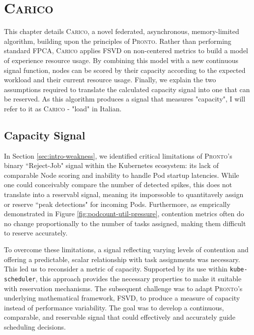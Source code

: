 \chapter{\protect\textsc{Carico}}
This chapter details \textsc{Carico}, a novel federated, asynchronous,
memory-limited algorithm, building upon the principles of \textsc{Pronto}.
Rather than performing standard FPCA, \textsc{Carico} applies FSVD on
non-centered metrics to build a model of experience resource usage. By combining
this model with a new continuous signal function, nodes can be scored by their
capacity according to the expected workload and their current resource usage.
Finally, we explain the two assumptions required to translate the calculated
capacity signal into one that can be reserved. As this algorithm produces a
signal that measures "capacity", I will refer to it as \textsc{Carico} - "load"
in Italian.

\section{Capacity Signal}
In Section \ref{sec:intro-weakness}, we identified critical limitations of
\textsc{Pronto}'s binary ``Reject-Job" signal within the Kubernetes ecosystem:
its lack of comparable Node scoring and inability to handle Pod startup
latencies. While one could conceivably compare the number of detected spikes,
this does not translate into a reservabl signal, meaning its imporssoble to
quantitavely assign or reserve ``peak detections" for incoming Pods.
Furthermore, as emprically demonstrated in Figure
\ref{fig:podcount-util-pressure}, contention metrics often do no change
proportionally to the number of tasks assigned, making them difficult to reserve
accurately.

To overcome these limitations, a signal reflecting varying levels of contention
and offering a predictable, scalar relationship with task assignments was
necessary. This led us to reconsider a metric of capacity. Supported by its use
within \texttt{kube-scheduler}, this approach provides the necessary properties
to make it suitable with reservation mechanisms. The subsequent challenge was to
adapt \textsc{Pronto}'s underlying mathematical framework, FSVD, to produce a
measure of capacity instead of performance variability. The goal was to develop
a continuous, comparable, and reservable signal that could effectively and
accurately guide scheduling decisions.

